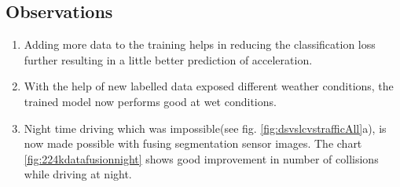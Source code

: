 \subsection*{Observations}
\begin{enumerate}
    \item Adding more data to the training helps in reducing the classification loss
        further resulting in a little better prediction of acceleration.
    \item With the help of new labelled data exposed different weather conditions, the
        trained model now performs good at wet conditions.
    \item Night time driving which was impossible(see fig. \ref{fig:dsvslcvstrafficAll}a),
        is now made possible with fusing segmentation sensor images. The chart
        \ref{fig:224kdatafusionnight} shows good improvement in number of collisions
        while driving at night.
\end{enumerate}


